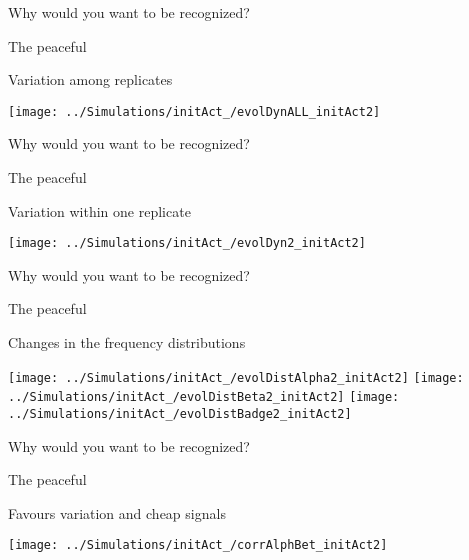 \documentclass[
  ignorenonframetext,
]{beamer}
\begin{document}
\begin{frame}{Why would you want to be recognized?}
\protect\hypertarget{why-would-you-want-to-be-recognized-1}{}

\begin{block}{The peaceful}

Variation among replicates

\begin{flushleft}\texttt{[image: ../Simulations/initAct\_/evolDynALL\_initAct2]} \end{flushleft}

\end{block}

\end{frame}

\begin{frame}{Why would you want to be recognized?}
\protect\hypertarget{why-would-you-want-to-be-recognized-2}{}

\begin{block}{The peaceful}

Variation within one replicate

\begin{flushleft}\texttt{[image: ../Simulations/initAct\_/evolDyn2\_initAct2]} \end{flushleft}

\end{block}

\end{frame}

\begin{frame}{Why would you want to be recognized?}
\protect\hypertarget{why-would-you-want-to-be-recognized-3}{}

\begin{block}{The peaceful}

Changes in the frequency distributions

\begin{flushleft}\texttt{[image: ../Simulations/initAct\_/evolDistAlpha2\_initAct2]} \texttt{[image: ../Simulations/initAct\_/evolDistBeta2\_initAct2]} \texttt{[image: ../Simulations/initAct\_/evolDistBadge2\_initAct2]} \end{flushleft}

\end{block}

\end{frame}

\begin{frame}{Why would you want to be recognized?}
\protect\hypertarget{why-would-you-want-to-be-recognized-4}{}

\begin{block}{The peaceful}

Favours variation and cheap signals

\begin{flushleft}\texttt{[image: ../Simulations/initAct\_/corrAlphBet\_initAct2]} \end{flushleft}

\end{block}

\end{frame}
\end{document}
